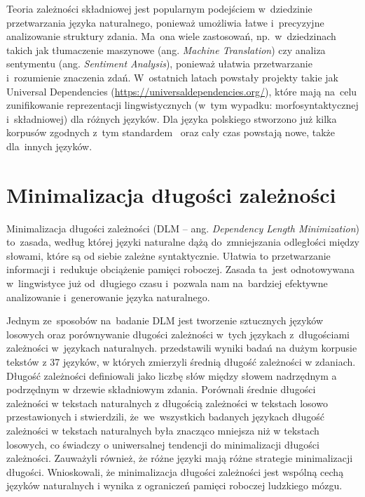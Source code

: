 \documentclass[licencjacka]{pracamgr_Kogni}
\begin{document}
    Teoria zależności składniowej jest popularnym podejściem w~dziedzinie przetwarzania języka naturalnego, ponieważ umożliwia łatwe i~precyzyjne analizowanie struktury zdania.
    Ma~ona wiele zastosowań, np.~w~dziedzinach takich jak tłumaczenie maszynowe (ang. \textit{Machine Translation}) czy analiza sentymentu (ang. \textit{Sentiment Analysis}), ponieważ ułatwia przetwarzanie i~rozumienie znaczenia zdań.
    W~ostatnich latach powstały projekty takie jak Universal Dependencies (\url{https://universaldependencies.org/}), które mają na~celu zunifikowanie reprezentacji lingwistycznych (w~tym wypadku: morfosyntaktycznej i~składniowej) dla różnych języków.
    Dla języka polskiego stworzono już kilka korpusów zgodnych z~tym standardem~\citep{Przepiorkowski2020, Wroblewska2020} oraz cały czas powstają nowe, także dla~innych języków.


    \section{Minimalizacja długości zależności}\label{sec:minimalizacja-dugosci-zaleznosci}
    Minimalizacja długości zależności (DLM -- ang. \textit{Dependency Length Minimization}) to~zasada, według której języki naturalne dążą do~zmniejszania odległości między słowami, które są od siebie zależne syntaktycznie.
    Ułatwia to przetwarzanie informacji i~redukuje obciążenie pamięci roboczej.
    Zasada ta~jest odnotowywana w~lingwistyce już od~długiego czasu i~pozwala nam na~bardziej efektywne analizowanie i~generowanie języka naturalnego.

    Jednym ze~sposobów na~badanie DLM jest tworzenie sztucznych języków losowych oraz porównywanie długości zależności w~tych językach z~długościami zależności w~językach naturalnych. \citet{FutrellEtAl2015} przedstawili wyniki badań na dużym korpusie tekstów z 37 języków, w których zmierzyli średnią długość zależności w zdaniach.
    Długość zależności definiowali jako liczbę słów między słowem nadrzędnym a podrzędnym w drzewie składniowym zdania.
    Porównali średnie długości zależności w tekstach naturalnych z długością zależności w tekstach losowo przestawionych i stwierdzili, że~we~wszystkich badanych językach długość zależności w tekstach naturalnych była znacząco mniejsza niż w tekstach losowych, co świadczy o uniwersalnej tendencji do minimalizacji długości zależności.
    Zauważyli również, że różne języki mają różne strategie minimalizacji długości.
    Wnioskowali, że minimalizacja długości zależności jest wspólną cechą języków naturalnych i wynika z ograniczeń pamięci roboczej ludzkiego mózgu.
\end{document}

